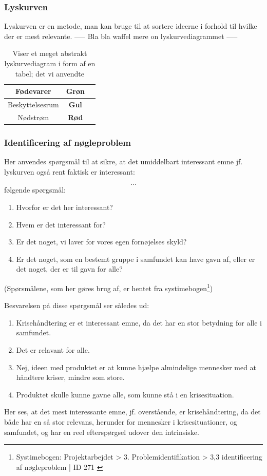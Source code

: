 \subsubsection{Lyskurven}
Lyskurven er en metode, man kan bruge til at sortere ideerne i forhold til hvilke der er mest relevante.
----- Bla bla waffel mere on lyskurvediagrammet -----

\begin{table}[H]
    \centering
    \begin{tabular}{|c|c|c|}
        \hline
        Fødevarer & \textbf{Grøn} \\
        \hline
        Beskyttelsesrum & \textbf{Gul} \\
        \hline
        Nødstrøm & \textbf{Rød} \\
        \hline
    \end{tabular}
    \caption{Viser et meget abstrakt lyskurvediagram i form af en tabel; det vi anvendte}
\end{table}

\newpage

\subsubsection{Identificering af nøgleproblem}
Her anvendes spørgsmål til at sikre, at det umiddelbart interessant emne jf. lyskurven også rent faktisk er interessant:
\begin{displayquote}
\[...\] følgende spørgsmål:
\begin{enumerate}
    \item Hvorfor er det her interessant?
    \item Hvem er det interessant for?
    \item Er det noget, vi laver for vores egen fornøjelses skyld?
    \item Er det noget, som en bestemt gruppe i samfundet kan have gavn af, eller er det noget, der er til gavn for alle?
\end{enumerate}
\end{displayquote}
(Spørsmålene, som her gøres brug af, er hentet fra systimebogen\footnote{Systimebogen: Projektarbejdet >
3. Problemidentifikation > 3,3 identificering af nøgleproblem | ID 271 \cite{projektarbejdet}})

\vspace{1em}

Besvarelsen på disse spørgsmål ser således ud:
\begin{enumerate}
    \item Krisehåndtering er et interessant emne, da det har en stor betydning for alle i samfundet.
    \item Det er relavant for alle.
    \item Nej, ideen med produktet er at kunne hjælpe almindelige mennesker med at håndtere kriser, mindre som store.
    \item Produktet skulle kunne gavne alle, som kunne stå i en krisesituation.
\end{enumerate}

Her ses, at det mest interessante emne, jf. overstående, er krisehåndtering, da det både har en så stor relevans, herunder for mennesker i krisesituationer, og samfundet, og har en reel efterspørgsel udover den intrinsiske.
